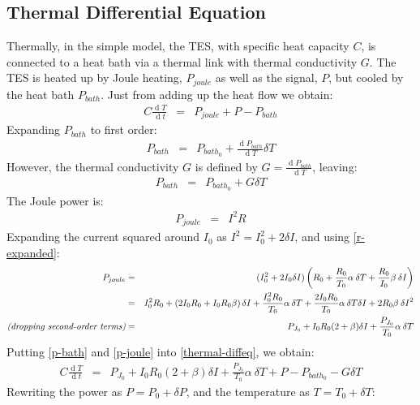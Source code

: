 \documentclass[letterpaper,10pt]{article}
\begin{document}
\subsection{Thermal Differential Equation}
Thermally, in the simple model, the TES, with specific heat capacity $C$, is connected to a heat bath via a thermal link with thermal conductivity $G$. The TES is heated up by Joule heating, $P_{joule}$ as well as the signal, $P$, but cooled by the heat bath $P_{bath}$. Just from adding up the heat flow we obtain:
\begin{eqnarray}
	C \frac{\operatorname{d}T}{\operatorname{d}t} &=& P_{joule} + P - P_{bath} \label{thermal-diffeq}
\end{eqnarray}
Expanding $P_{bath}$ to first order:
\begin{eqnarray}
	P_{bath} &=& P_{bath_0} + \frac{\operatorname{d} P_{bath}}{\operatorname{d} T} \delta T
\end{eqnarray}
However, the thermal conductivity $G$ is defined by $G = \frac{\operatorname{d} P_{bath}}{\operatorname{d} T}$, leaving:
\begin{eqnarray}
	P_{bath} &=& P_{bath_0} + G\delta T \label{p-bath}
\end{eqnarray}
The Joule power is:
\begin{eqnarray}
	P_{joule} &=& I^2 R
\end{eqnarray}
Expanding the current squared around $I_0$ as $I^2 = I_0^2 + 2 \delta I$, and using \eqref{r-expanded}:
\begin{eqnarray}
	P_{joule} &=& (I_0^2 + 2 I_0 \delta I)\left(R_0 + \frac{R_0}{T_0}\alpha \: \delta T + \frac{R_0}{I_0}\beta \: \delta I\right) \\
	&=& I_0^2 R_0 + \left(2 I_0 R_0 + I_0 R_0\beta\right) \delta I + \frac{I_0^2 R_0}{T_0}\alpha \: \delta T + \frac{2 I_0 R_0}{T_0}\alpha \: \delta T \delta I + 2R_0 \beta \: {\delta I}^2 \\
	\mbox{\em{(dropping second-order terms)}} &=& P_{J_0} + I_0 R_0 (2 + \beta) \delta I + \frac{P_{J_0}}{T_0}\alpha \: \delta T \label{p-joule}
\end{eqnarray}
Putting \eqref{p-bath} and \eqref{p-joule} into \eqref{thermal-diffeq}, we obtain:
\begin{eqnarray}
	C \frac{\operatorname{d}T}{\operatorname{d}t} &=& P_{J_0} + I_0 R_0 (2 + \beta) \delta I + \frac{P_{J_0}}{T_0}\alpha \: \delta T + P - P_{bath_0} - G\delta T 
\end{eqnarray}
Rewriting the power as $P = P_0 + \delta P$, and the temperature as $T = T_0 + \delta T$:
\end{document}
